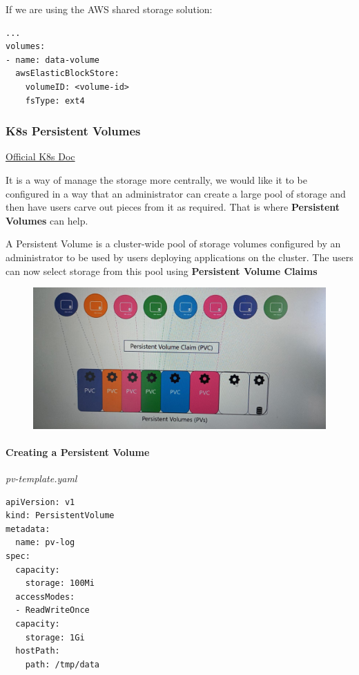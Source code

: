\documentclass{article}
\newenvironment{codetemplate}[1][]{%
  \mybasecolorbox[#1]
  \itshape
}{%
  \endmybasecolorbox
}
\begin{document}
If we are using the AWS shared storage solution:
\begin{codetemplate}{}
\begin{verbatim}
...
volumes:
- name: data-volume
  awsElasticBlockStore:
    volumeID: <volume-id>
    fsType: ext4
\end{verbatim}
\end{codetemplate}

\subsubsection{K8s Persistent Volumes}

\href{https://kubernetes.io/docs/concepts/storage/persistent-volumes/}{Official K8s Doc}

It is a way of manage the storage more centrally, we would like it to be configured in a way that an administrator can create a large pool of storage and then have users carve out pieces from it as required. That is where \textbf{Persistent Volumes} can help.

A Persistent Volume is a cluster-wide pool of storage volumes configured by an administrator to be used by users deploying applications on the cluster. The users can now select storage from this pool using \textbf{Persistent Volume Claims}

\begin{figure}[H]
    \includegraphics[width=\textwidth]{pictures/pv.png}
\end{figure}

\paragraph{Creating a Persistent Volume}

\begin{codetemplate}{pv-template.yaml}
\begin{verbatim}
apiVersion: v1
kind: PersistentVolume
metadata:
  name: pv-log
spec:
  capacity:
    storage: 100Mi
  accessModes:
  - ReadWriteOnce
  capacity:
    storage: 1Gi
  hostPath:
    path: /tmp/data
\end{verbatim}
\end{codetemplate}
\end{document}
